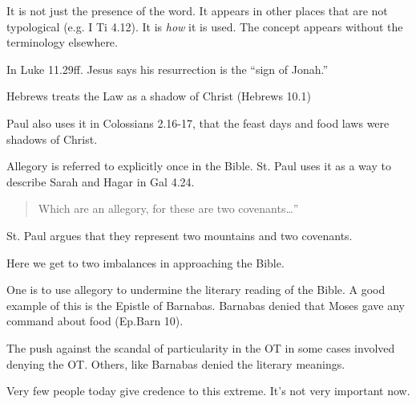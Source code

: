 \documentclass{beamer}
\begin{document}
\begin{frame}
  It is not just the presence of the word.
  It appears in other places that are not typological (e.g. I Ti 4.12).
  It is \emph{how} it is used.
  The concept appears without the terminology elsewhere.
\end{frame}

\begin{frame}
  In Luke 11.29ff. Jesus says his resurrection is the ``sign of Jonah.''
\end{frame}

\begin{frame}
  Hebrews treats the Law as a shadow of Christ (Hebrews 10.1)
\end{frame}

\begin{frame}
  Paul also uses it in Colossians 2.16-17, that the feast days and food laws were shadows of Christ.
\end{frame}

\begin{frame}
  Allegory is referred to explicitly once in the Bible.
  St. Paul uses it as a way to describe Sarah and Hagar in Gal 4.24.
  \begin{quote}
	Which are an allegory, for these are two covenants\ldots ''
  \end{quote}
\end{frame}

\begin{frame}
  St. Paul argues that they represent two mountains and two covenants.
\end{frame}

\begin{frame}
  Here we get to two imbalances in approaching the Bible.
\end{frame}

\begin{frame}
  One is to use allegory to undermine the literary reading of the Bible.
  A good example of this is the Epistle of Barnabas.
  Barnabas denied that Moses gave any command about food (Ep.Barn 10).
\end{frame}

\begin{frame}
  The push against the scandal of particularity in the OT in some cases involved denying the OT.
  Others, like Barnabas denied the literary meanings.
\end{frame}

\begin{frame}
  Very few people today give credence to this extreme.
  It's not very important now.
\end{frame}
\end{document}
